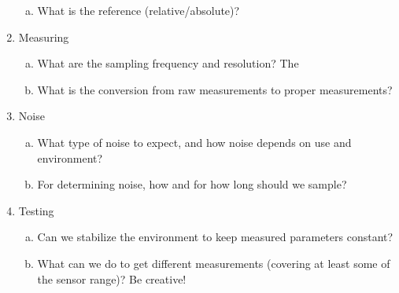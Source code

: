 \begin{enumerate}
\begin{enumerate}[(a)]
            \item What is the reference (relative/absolute)?
        \end{enumerate}
    \item Measuring
        \begin{enumerate}[(a)]
            \item What are the sampling frequency and resolution?
            The
            \item What is the conversion from raw measurements to proper measurements?
        \end{enumerate}
    \item Noise
        \begin{enumerate}[(a)]
            \item What type of noise to expect, and how noise depends on use and environment?
            \item For determining noise, how and for how long should we sample?
        \end{enumerate}
    \item Testing
        \begin{enumerate}[(a)]
            \item Can we stabilize the environment to keep measured parameters constant?
            \item What can we do to get different measurements (covering at least some of the sensor range)? Be creative!
        \end{enumerate}
\end{enumerate}






